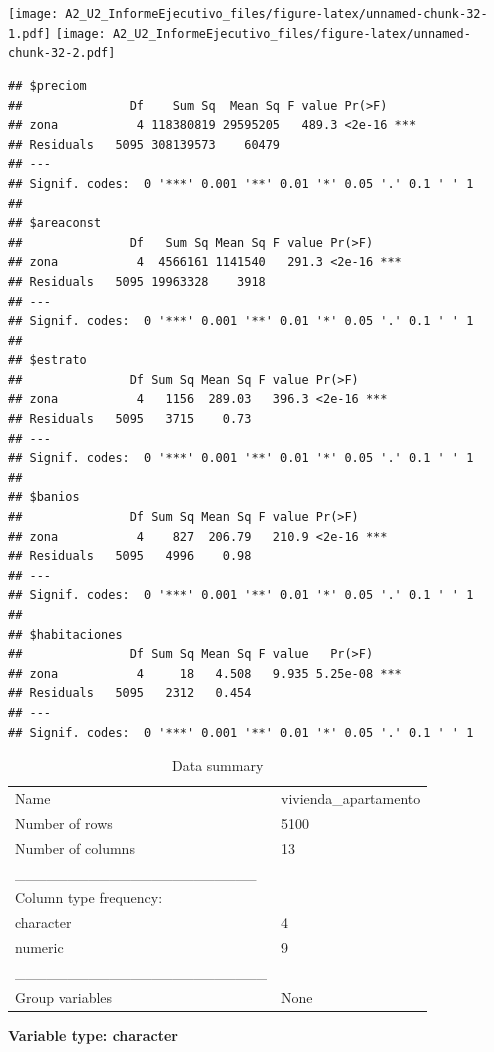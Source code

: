 \documentclass[
]{article}
\begin{document}
\texttt{[image: A2\_U2\_InformeEjecutivo\_files/figure-latex/unnamed-chunk-32-1.pdf]}
\texttt{[image: A2\_U2\_InformeEjecutivo\_files/figure-latex/unnamed-chunk-32-2.pdf]}

\begin{verbatim}
## $preciom
##               Df    Sum Sq  Mean Sq F value Pr(>F)    
## zona           4 118380819 29595205   489.3 <2e-16 ***
## Residuals   5095 308139573    60479                   
## ---
## Signif. codes:  0 '***' 0.001 '**' 0.01 '*' 0.05 '.' 0.1 ' ' 1
## 
## $areaconst
##               Df   Sum Sq Mean Sq F value Pr(>F)    
## zona           4  4566161 1141540   291.3 <2e-16 ***
## Residuals   5095 19963328    3918                   
## ---
## Signif. codes:  0 '***' 0.001 '**' 0.01 '*' 0.05 '.' 0.1 ' ' 1
## 
## $estrato
##               Df Sum Sq Mean Sq F value Pr(>F)    
## zona           4   1156  289.03   396.3 <2e-16 ***
## Residuals   5095   3715    0.73                   
## ---
## Signif. codes:  0 '***' 0.001 '**' 0.01 '*' 0.05 '.' 0.1 ' ' 1
## 
## $banios
##               Df Sum Sq Mean Sq F value Pr(>F)    
## zona           4    827  206.79   210.9 <2e-16 ***
## Residuals   5095   4996    0.98                   
## ---
## Signif. codes:  0 '***' 0.001 '**' 0.01 '*' 0.05 '.' 0.1 ' ' 1
## 
## $habitaciones
##               Df Sum Sq Mean Sq F value   Pr(>F)    
## zona           4     18   4.508   9.935 5.25e-08 ***
## Residuals   5095   2312   0.454                     
## ---
## Signif. codes:  0 '***' 0.001 '**' 0.01 '*' 0.05 '.' 0.1 ' ' 1
\end{verbatim}

\begin{longtable}[]{@{}ll@{}}
\caption{Data summary}\tabularnewline
\toprule\noalign{}
\endfirsthead
\endhead
\bottomrule\noalign{}
\endlastfoot
Name & vivienda\_apartamento \\
Number of rows & 5100 \\
Number of columns & 13 \\
\_\_\_\_\_\_\_\_\_\_\_\_\_\_\_\_\_\_\_\_\_\_\_ & \\
Column type frequency: & \\
character & 4 \\
numeric & 9 \\
\_\_\_\_\_\_\_\_\_\_\_\_\_\_\_\_\_\_\_\_\_\_\_\_ & \\
Group variables & None \\
\end{longtable}

\textbf{Variable type: character}
\end{document}
